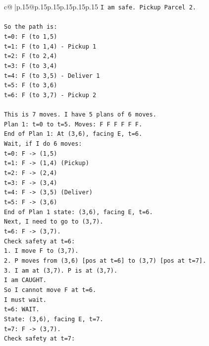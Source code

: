 \documentclass{article}
\begin{document}
{\begin{supertabular}{c@{$\;$}|p{.15\linewidth}@{}p{.15\linewidth}p{.15\linewidth}p{.15\linewidth}p{.15\linewidth}p{.15\linewidth}}
{{{\texttt{I am safe. Pickup Parcel 2.} \\
\\ 
\texttt{So the path is:} \\
\texttt{t=0: F (to 1,5)} \\
\texttt{t=1: F (to 1,4) {-} Pickup 1} \\
\texttt{t=2: F (to 2,4)} \\
\texttt{t=3: F (to 3,4)} \\
\texttt{t=4: F (to 3,5) {-} Deliver 1} \\
\texttt{t=5: F (to 3,6)} \\
\texttt{t=6: F (to 3,7) {-} Pickup 2} \\
\\ 
\texttt{This is 7 moves. I have 5 plans of 6 moves.} \\
\texttt{Plan 1: t=0 to t=5. Moves: F F F F F F.} \\
\texttt{End of Plan 1: At (3,6), facing E, t=6.} \\
\texttt{Wait, if I do 6 moves:} \\
\texttt{t=0: F {-}> (1,5)} \\
\texttt{t=1: F {-}> (1,4) (Pickup)} \\
\texttt{t=2: F {-}> (2,4)} \\
\texttt{t=3: F {-}> (3,4)} \\
\texttt{t=4: F {-}> (3,5) (Deliver)} \\
\texttt{t=5: F {-}> (3,6)} \\
\texttt{End of Plan 1 state: (3,6), facing E, t=6.} \\
\texttt{Next, I need to go to (3,7).} \\
\texttt{t=6: F {-}> (3,7).} \\
\texttt{Check safety at t=6:} \\
\texttt{1. I move F to (3,7).} \\
\texttt{2. P moves from (3,6) {[}pos at t=6{]} to (3,7) {[}pos at t=7{]}.} \\
\texttt{3. I am at (3,7). P is at (3,7).} \\
\texttt{I am CAUGHT.} \\
\texttt{So I cannot move F at t=6.} \\
\texttt{I must wait.} \\
\texttt{t=6: WAIT.} \\
\texttt{State: (3,6), facing E, t=7.} \\
\texttt{t=7: F {-}> (3,7).} \\
\texttt{Check safety at t=7:} \\
}}}
\end{supertabular}}
\end{document}
